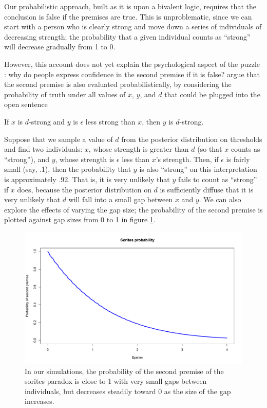 \documentclass[pdfextras]{handbook}
\begin{document}
Our probabilistic approach, built as it is upon a bivalent logic, requires that the conclusion is false if the premises are true. 
This is unproblematic, since we can start with a person who is clearly strong and move down a series of individuals of decreasing strength; the probability that a given individual counts as ``strong'' will decrease gradually from 1 to 0. 

However, this account does not yet explain the psychological aspect of the puzzle \citep{graff00}: why do people express confidence in the second premise if it is false? 
\citet{lassitergoodman13} argue that the second premise is also evaluated probabilistically, by considering the probability of truth under all values of $x$, $y$, and $d$ that could be plugged into the open sentence 
\begin{center}
If $x$ is $d$-strong and $y$ is $\epsilon$ less strong than $x$, then $y$ is $d$-strong.
\end{center}
Suppose that we sample a value of $d$ from the posterior distribution on thresholds and find two individuals: $x$, whose strength is greater than $d$ (so that $x$ counts as ``strong''), and $y$, whose strength is $\epsilon$ less than $x$'s strength. 
Then, if $\epsilon$ is fairly small (say, .1), then the probability that $y$ is also ``strong'' on this interpretation is approximately .92. 
That is, it is very unlikely that $y$ fails to count as ``strong'' if $x$ does, because the posterior distribution on $d$ is sufficiently diffuse that it is very unlikely that $d$ will fall into a small gap between $x$ and $y$.
We can also explore the effects of varying the gap size; the probability of the second premise is plotted against gap sizes from 0 to 1 in figure \ref{sorites}.
 \begin{figure}[tbh]
\begin{center}
\includegraphics[scale=.4]{sorites-prob.pdf}
\end{center}
\label{sorites}
\caption{In our simulations, the probability of the second premise of the sorites paradox is close to 1 with very small gaps between individuals, but decreases steadily toward 0 as the size of the gap increases.}
\end{figure}
\end{document}

